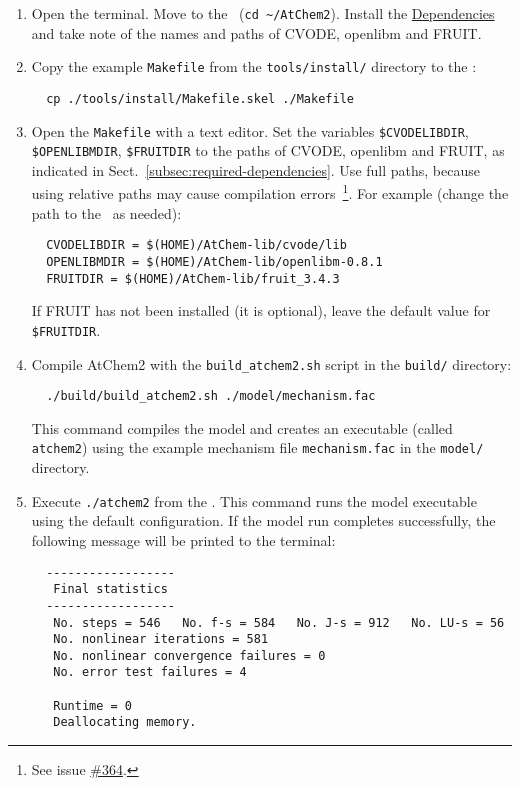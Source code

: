 \begin{enumerate}
\item Open the terminal. Move to the \maindir\ (\verb|cd ~/AtChem2|).
  Install the \hyperref[sec:dependencies]{Dependencies} and take note
  of the names and paths of CVODE, openlibm and FRUIT.
\item Copy the example \texttt{Makefile} from the
  \texttt{tools/install/} directory to the \maindir:
  \begin{verbatim}
  cp ./tools/install/Makefile.skel ./Makefile
  \end{verbatim}
\item Open the \texttt{Makefile} with a text editor. Set the variables
  \texttt{\$CVODELIBDIR}, \texttt{\$OPENLIBMDIR}, \texttt{\$FRUITDIR} to
  the paths of CVODE, openlibm and FRUIT, as indicated in
  Sect.~\ref{subsec:required-dependencies}. Use full paths, because
  using relative paths may cause compilation errors~\footnote{See
    issue \href{https://github.com/AtChem/AtChem2/issues/364}{\#364}.}.
  For example (change the path to the \depdir\ as needed):
  \begin{verbatim}
  CVODELIBDIR = $(HOME)/AtChem-lib/cvode/lib
  OPENLIBMDIR = $(HOME)/AtChem-lib/openlibm-0.8.1
  FRUITDIR = $(HOME)/AtChem-lib/fruit_3.4.3
  \end{verbatim}
  If FRUIT has not been installed (it is optional), leave the default
  value for \texttt{\$FRUITDIR}.
\item Compile AtChem2 with the \texttt{build\_atchem2.sh} script in
  the \texttt{build/} directory:
  \begin{verbatim}
  ./build/build_atchem2.sh ./model/mechanism.fac
  \end{verbatim}
  This command compiles the model and creates an executable (called
  \texttt{atchem2}) using the example mechanism file \texttt{mechanism.fac} in
  the \texttt{model/} directory.
\item Execute \verb|./atchem2| from the \maindir. This command runs
  the model executable using the default configuration. If the model
  run completes successfully, the following message will be printed to
  the terminal:
  \begin{verbatim}
  ------------------
   Final statistics
  ------------------
   No. steps = 546   No. f-s = 584   No. J-s = 912   No. LU-s = 56
   No. nonlinear iterations = 581
   No. nonlinear convergence failures = 0
   No. error test failures = 4

   Runtime = 0
   Deallocating memory.
  \end{verbatim}
\end{enumerate}

